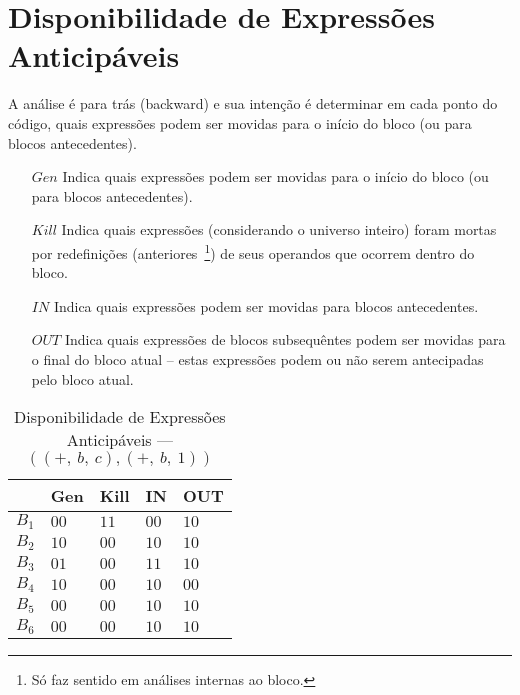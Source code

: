 \section{Disponibilidade de Express\~oes Anticip\'aveis}

A an\'alise \'e para tr\'as (\textsf{backward}) e sua inten\c{c}\~ao \'e determinar em cada ponto do c\'odigo, quais express\~oes podem ser movidas para o in\'icio do bloco (ou para blocos antecedentes).
\begin{itemize}
  \item[$Gen$] Indica quais express\~oes podem ser movidas para o in\'icio do bloco (ou para blocos antecedentes).
  \item[$Kill$] Indica quais express\~oes (considerando o universo inteiro) foram mortas por redefini\c{c}\~oes (anteriores~\footnote{S\'o faz sentido em an\'alises internas ao bloco.}) de seus operandos que ocorrem dentro do bloco.
  \item[$IN$] Indica quais express\~oes podem ser movidas para blocos antecedentes.
  \item[$OUT$] Indica quais express\~oes de blocos subsequ\^entes podem ser movidas para o final do bloco atual -- estas express\~oes podem ou n\~ao serem antecipadas pelo bloco atual.
\end{itemize}

\begin{table}[ht]
\centering
\begin{tabular}{l|l|l|l|l}
	& Gen & Kill & IN & OUT\\
\hline
$B_{1}$ &  $00$ & $11$ & $00$ & $10$\\
$B_{2}$ &  $10$ & $00$ & $10$ & $10$\\
$B_{3}$ &  $01$ & $00$ & $11$ & $10$\\
$B_{4}$ &  $10$ & $00$ & $10$ & $00$\\
$B_{5}$ &  $00$ & $00$ & $10$ & $10$\\
$B_{6}$ &  $00$ & $00$ & $10$ & $10$\\
\end{tabular}
\caption{Disponibilidade de Express\~oes Anticip\'aveis --- $((+,\:b,\:c), (+,\:b,\:1))$}
\end{table}

